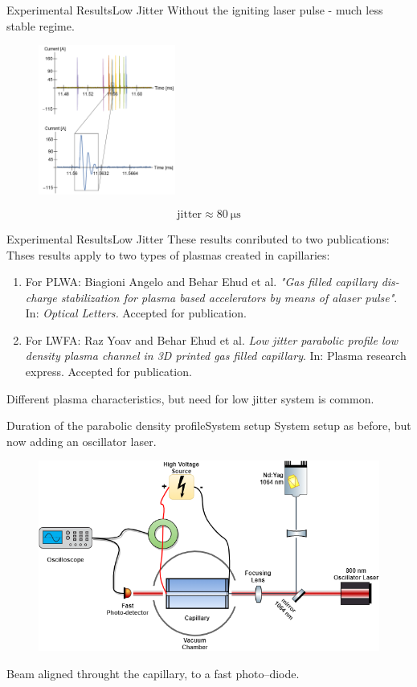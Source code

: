 \documentclass[draft]{beamer}
\begin{document}
  \begin{frame}{Experimental Results}{Low Jitter}
    Without the igniting laser pulse - much less stable regime.
    \begin{figure}
      \includegraphics[width=0.4\textwidth]{figures/results/high_jitter.png}
    \end{figure}
    $$\text{jitter}\approx \SI{80}{\us}$$
  \end{frame}
  \begin{frame}{Experimental Results}{Low Jitter}
    These results conributed to two publications:
    Thses results apply to two types of plasmas created in capillaries:
    \begin{enumerate}
      \item For PLWA: Biagioni Angelo and Behar Ehud et al. \emph{"Gas filled capillary dis-charge stabilization for plasma based accelerators by means of alaser pulse"}. In: \emph{Optical Letters.} Accepted for publication.
      \item For LWFA: Raz Yoav and Behar Ehud et al. \emph{Low jitter parabolic profile low density plasma channel in 3D printed gas filled capillary}. In: Plasma research express. Accepted for publication.
    \end{enumerate}
    Different plasma characteristics, but need for low jitter system is common.
  \end{frame}
  \begin{frame}{Duration of the parabolic density profile}{System setup}
    System setup as before, but now adding an oscillator laser.
    \begin{figure}
     \includegraphics[width=\textwidth]{figures/results/oscillator/oscillator_system_setup.png} 
    \end{figure}
    Beam aligned throught the capillary, to a fast photo--diode.
  \end{frame}
\end{document}
